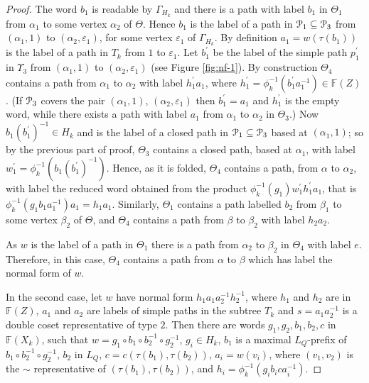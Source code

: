 \documentclass[a4paper,12pt]{article}
\renewcommand{\a}{\alpha }
\renewcommand{\b}{\beta }
\newcommand{\G}{\Gamma }
\newcommand{\e}{\varepsilon }
\newcommand{\T}{\Theta }
\renewcommand{\t}{\tau }
\newcommand{\U}{\Upsilon }
\newcommand{\cP}{{\cal{P}}}
\numberwithin{equation}{section}
\numberwithin{figure}{section}
\newcommand{\FF}{\ensuremath{\mathbb{F}}}
\begin{document}
\begin{proof}
The word $b_1$ is readable by $\G_{H_k}$ and there
is a path with label $b_1$ in $\T_1$ from $\a_1$ to some vertex $\a_2$
of $\T$.
Hence $b_1$ is the label of a path in $\cP_1\subseteq \cP_3$ from $(\a_1,1)$ to
$(\a_2,\e_1)$, for some vertex $\e_1$ of $\G_{H_k}$.
By definition $a_1=w(\t(b_1))$ is the label of a path in $T_k$ from $1$ to $\e_1$.
Let $b_1^\prime$
 be the label of the simple path $p_1^\prime$ in $\U_3$ from
$(\a_1,1)$ to $(\a_2,\e_1)$ (see Figure \ref{fig:nf-1}). By construction $\T_4$ contains a path
from $\a_1$ to $\a_2$ with label $h_1^\prime a_1$, where
$h_1^\prime =\phi_k^{-1}(b_1^\prime a_1^{-1})\in \FF(Z)$.
(If $\cP_3$ covers the pair $(\a_1,1)$, $(\a_2,\e_1)$ then
$b_1^\prime=a_1$ and $h_1^\prime$ is the empty word, while there
exists a path with label $a_1$ from $\a_1$ to $\a_2$ in $\T_3$.)
Now $b_1(b_1^\prime)^{-1}\in H_k$ and is the label of a closed
path  in $\cP_1\subseteq \cP_3$ based at $(\a_1,1)$; so by the
previous part of proof, $\T_3$ contains a closed path, based at $\a_1$,
 with label
$w_1^\prime=\phi_k^{-1}(b_1(b_1^\prime)^{-1})$. Hence, as it is folded,
$\T_4$ contains a path, from $\a$ to $\a_2$,
with label the reduced word obtained from the product
$\phi_k^{-1}(g_1)w_1^{\prime} h_1^\prime a_1$, that is
 $\phi_k^{-1}(g_1b_1a_1^{-1}) a_1=h_1a_1$.
 Similarly, $\T_1$ contains a path labelled $b_2$ from $\b_1$ to
some vertex $\b_2$ of $\T$, and $\T_4$ contains a path from
$\b$ to $\b_2$ with label $h_2a_2$.

As $w$ is the label of a path in $\T_1$ there is a path from $\a_2$ to
$\b_2$ in $\T_4$ with label $e$. Therefore, in this case, $\T_4$ contains
a path from $\a$ to $\b$ which has label the normal form of $w$.



In the second case,
let $w$ have normal form $h_1 a_1 a_2^{-1} h_2^{-1} $, where
$h_1$ and $h_2$ are in $\FF(Z)$,  $a_1$ and $a_2$ are labels
of simple paths in the subtree $T_k$ and $s=a_1a_2^{-1}$ is a double coset
representative of type $2$. Then there are words
$g_1, g_2, b_1, b_2, c$  in $\FF(X_k)$,  such that
$w=g_1\circ b_1 \circ b_2^{-1}\circ g_2^{-1}$,
$g_i\in H_k$, $b_1$ is a maximal $L_Q$-prefix of
$b_1 \circ b_2^{-1}\circ g_2^{-1}$, $b_2$ in
$L_Q$, $c=c(\t(b_1),\t(b_2))$, $a_i=w(v_i)$, where
$(v_1,v_2)$ is the $\sim$ representative of $(\t(b_1),\t(b_2))$, 
and $h_i=\phi_k^{-1}(g_ib_ica_i^{-1})$.


\end{proof}
\end{document}
